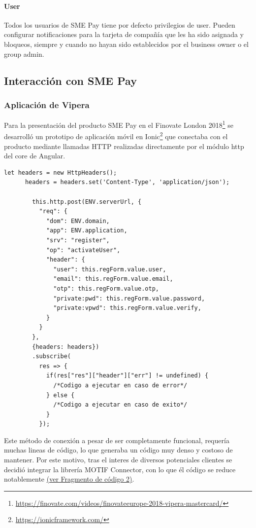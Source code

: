 \documentclass[a4paper, 12pt]{article}
\newenvironment{code}{\captionsetup{type=listing}}{}
\begin{document}
\paragraph{User}
\label{sec-3-1-5-3}
\label{sec:user}
Todos los usuarios de SME Pay tiene por defecto privilegios de user. Pueden configurar notificaciones para la tarjeta de compañía que les ha sido asignada y bloqueos, siempre y cuando no hayan sido
establecidos por el business owner o el group admin.

\subsection{Interacción con SME Pay}
\label{sec-3-2}
\subsubsection{Aplicación de Vipera}
\label{sec-3-2-1}
Para la presentación del producto SME Pay en el Finovate London 2018\footnote{\url{https://finovate.com/videos/finovateeurope-2018-vipera-mastercard/}} se desarrolló un prototipo de aplicación móvil en Ionic\footnote{\url{https://ionicframework.com/}} que conectaba con el producto mediante llamadas HTTP realizadas directamente por
el módulo http del core de Angular.
\begin{code}
\label{code:angularhttp}
\begin{verbatim}
let headers = new HttpHeaders();
      headers = headers.set('Content-Type', 'application/json');

        this.http.post(ENV.serverUrl, {
          "req": {
            "dom": ENV.domain,
            "app": ENV.application,
            "srv": "register",
            "op": "activateUser",
            "header": {
              "user": this.regForm.value.user,
              "email": this.regForm.value.email,
              "otp": this.regForm.value.otp,
              "private:pwd": this.regForm.value.password,
              "private:vpwd": this.regForm.value.verify,
            }
          }
        },
        {headers: headers})
        .subscribe(
          res => {
            if(res["res"]["header"]["err"] != undefined) {
              /*Codigo a ejecutar en caso de error*/
            } else {
              /*Codigo a ejecutar en caso de exito*/
            }
          });
\end{verbatim}
\end{code}
\bigbreak
Este método de conexión a pesar de ser completamente funcional, requería muchas lineas de código, lo que generaba un código muy denso y costoso de mantener. Por este motivo, tras el interes de
diversos potenciales clientes se decidió integrar la librería MOTIF Connector, con lo que él código se reduce notablemente \hyperref[code:motifconnector]{(ver Fragmento de código 2)}.
\end{document}
